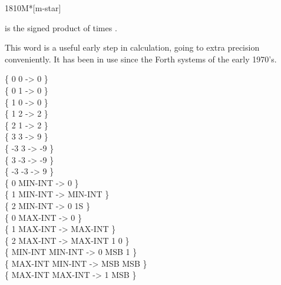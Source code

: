 \begin{worddef}{1810}{M*}[m-star]
\item {}

	 is the signed product of  times .

	\begin{defer}
	\rationale %
		This word is a useful early step in calculation, going to
		extra precision conveniently. It has been in use since the
		Forth systems of the early 1970's.

	\testing
		\{       0       0  ->       0  \} \\
		\{       0       1  ->       0  \} \\
		\{       1       0  ->       0  \} \\
		\{       1       2  ->       2  \} \\
		\{       2       1  ->       2  \} \\
		\{       3       3  ->       9  \} \\
		\{      -3       3  ->      -9  \} \\
		\{       3      -3  ->      -9  \} \\
		\{      -3      -3  ->       9  \} \\
		\{       0 MIN-INT  ->       0  \} \\
		\{       1 MIN-INT  -> MIN-INT  \} \\
		\{       2 MIN-INT  ->       0 1S \} \\
		\{       0 MAX-INT  ->       0  \} \\
		\{       1 MAX-INT  -> MAX-INT  \} \\
		\{       2 MAX-INT  -> MAX-INT     1  0 \} \\
		\{ MIN-INT MIN-INT  ->       0 MSB 1  \} \\
		\{ MAX-INT MIN-INT  ->     MSB MSB  \} \\
		\{ MAX-INT MAX-INT  ->       1 MSB   \}
	\end{defer}
\end{worddef}



